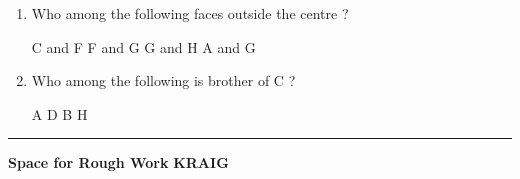 \documentclass[12pt]{exam}
\begin{document}
\begin{questions}
\begin{enumerate}
\end{enumerate}
\begin{enumerate}
\item Who among the following faces outside the centre ?
\begin{multicols}{2}
\begin{choices}
\choice C and F
\choice F and G
\choice G and H
\choice A and G

\end{choices}
\end{multicols}
\item Who among the following is brother of C ?
\begin{multicols}{2}
\begin{choices}
\choice 	A
\choice D
\choice B
\choice H
\addpoints

\end{choices}
\end{multicols}
\end{enumerate} 
\end{questions}
\rule[2ex]{\textwidth}{2pt}
\centering \textbf{Space for Rough Work}
\newpage
\centering \large \textbf{KRAIG}
\normalsize
\end{document}
